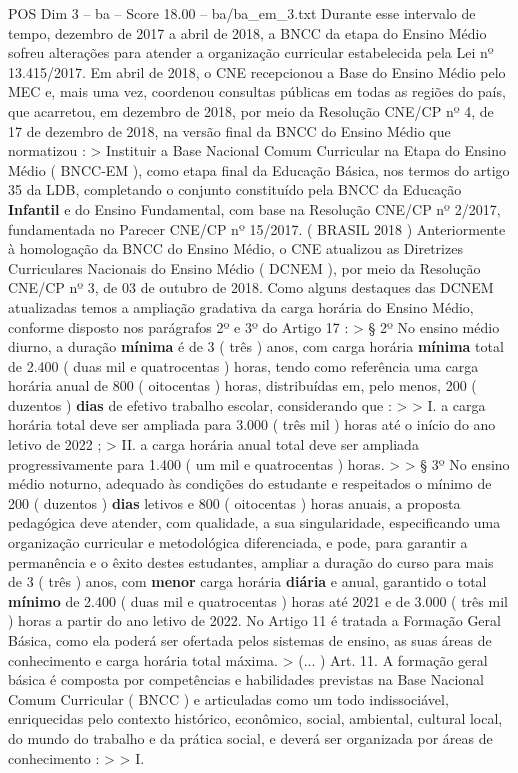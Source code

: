 \begin{textsample}{POS Dim 3 – ba – Score 18.00 – ba/ba\_em\_3.txt}
Durante esse intervalo de tempo, dezembro de 2017 a abril de 2018, a BNCC da etapa do Ensino Médio sofreu alterações para atender a organização curricular estabelecida pela Lei nº 13.415/2017.
Em abril de 2018, o CNE recepcionou a Base do Ensino Médio pelo MEC e, mais uma vez, coordenou consultas públicas em todas as regiões do país, que acarretou, em dezembro de 2018, por meio da Resolução CNE/CP nº 4, de 17 de dezembro de 2018, na versão final da BNCC do Ensino Médio que normatizou : > Instituir a Base Nacional Comum Curricular na Etapa do Ensino Médio ( BNCC-EM ), como etapa final da Educação Básica, nos termos do artigo 35 da LDB, completando o conjunto constituído pela BNCC da Educação \textbf{Infantil} e do Ensino Fundamental, com base na Resolução CNE/CP nº 2/2017, fundamentada no Parecer CNE/CP nº 15/2017. ( BRASIL 2018 ) Anteriormente à homologação da BNCC do Ensino Médio, o CNE atualizou as Diretrizes Curriculares Nacionais do Ensino Médio ( DCNEM ), por meio da Resolução CNE/CP nº 3, de 03 de outubro de 2018.
Como alguns destaques das DCNEM atualizadas temos a ampliação gradativa da carga horária do Ensino Médio, conforme disposto nos parágrafos 2º e 3º do Artigo 17 : > § 2º No ensino médio diurno, a duração \textbf{mínima} é de 3 ( três ) anos, com carga horária \textbf{mínima} total de 2.400 ( duas mil e quatrocentas ) horas, tendo como referência uma carga horária anual de 800 ( oitocentas ) horas, distribuídas em, pelo menos, 200 ( duzentos ) \textbf{dias} de efetivo trabalho escolar, considerando que : > > I. a carga horária total deve ser ampliada para 3.000 ( três mil ) horas até o início do ano letivo de 2022 ; > II. a carga horária anual total deve ser ampliada progressivamente para 1.400 ( um mil e quatrocentas ) horas. > > § 3º No ensino médio noturno, adequado às condições do estudante e respeitados o mínimo de 200 ( duzentos ) \textbf{dias} letivos e 800 ( oitocentas ) horas anuais, a proposta pedagógica deve atender, com qualidade, a sua singularidade, especificando uma organização curricular e metodológica diferenciada, e pode, para garantir a permanência e o êxito destes estudantes, ampliar a duração do curso para mais de 3 ( três ) anos, com \textbf{menor} carga horária \textbf{diária} e anual, garantido o total \textbf{mínimo} de 2.400 ( duas mil e quatrocentas ) horas até 2021 e de 3.000 ( três mil ) horas a partir do ano letivo de 2022.
No Artigo 11 é tratada a Formação Geral Básica, como ela poderá ser ofertada pelos sistemas de ensino, as suas áreas de conhecimento e carga horária total máxima. > (... ) Art. 11.
A formação geral básica é composta por competências e habilidades previstas na Base Nacional Comum Curricular ( BNCC ) e articuladas como um todo indissociável, enriquecidas pelo contexto histórico, econômico, social, ambiental, cultural local, do mundo do trabalho e da prática social, e deverá ser organizada por áreas de conhecimento : > > I.

\end{textsample}
